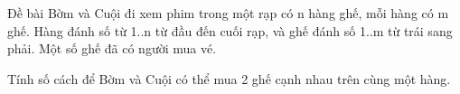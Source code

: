 Đề bài
Bờm và Cuội đi xem phim trong một rạp có n hàng ghế, mỗi hàng có m ghế. Hàng đánh số từ 1..n từ đầu đến cuối rạp, và ghế đánh số 1..m từ trái sang phải. Một số ghế đã có người mua vé.  

   Tính số cách để Bờm và Cuội có thể mua 2 ghế cạnh nhau trên cùng một hàng.